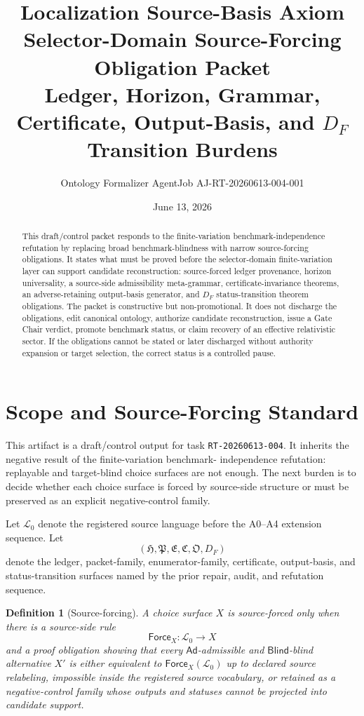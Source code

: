 \documentclass[11pt]{article}
\title{\textbf{Localization Source-Basis Axiom Selector-Domain Source-Forcing Obligation Packet}\\[0.35em]
\large Ledger, Horizon, Grammar, Certificate, Output-Basis, and \(D_F\) Transition Burdens}
\author{Ontology Formalizer AgentJob AJ-RT-20260613-004-001}
\date{June 13, 2026}
\newcommand{\Lang}{\mathcal{L}_{0}}
\newcommand{\PackFam}{\mathfrak{P}}
\newcommand{\EnumFam}{\mathfrak{E}}
\newcommand{\CertFam}{\mathfrak{C}}
\newcommand{\OutFam}{\mathfrak{O}}
\newcommand{\LedgerFam}{\mathfrak{H}}
\newcommand{\Ad}{\mathsf{Ad}}
\newcommand{\Blind}{\mathsf{Blind}}
\newcommand{\Force}{\mathsf{Force}}
\newtheorem{definitionblock}{Definition}
\begin{document}
\maketitle

\begin{abstract}
This draft/control packet responds to the finite-variation
benchmark-independence refutation by replacing broad benchmark-blindness with
narrow source-forcing obligations. It states what must be proved before the
selector-domain finite-variation layer can support candidate reconstruction:
source-forced ledger provenance, horizon universality, a source-side
admissibility meta-grammar, certificate-invariance theorems, an
adverse-retaining output-basis generator, and \(D_F\) status-transition
theorem obligations. The packet is constructive but non-promotional. It does
not discharge the obligations, edit canonical ontology, authorize candidate
reconstruction, issue a Gate Chair verdict, promote benchmark status, or
claim recovery of an effective relativistic sector. If the obligations cannot
be stated or later discharged without authority expansion or target
selection, the correct status is a controlled pause.
\end{abstract}

\section{Scope and Source-Forcing Standard}

This artifact is a draft/control output for task \texttt{RT-20260613-004}.
It inherits the negative result of the finite-variation benchmark-
independence refutation: replayable and target-blind choice surfaces are not
enough. The next burden is to decide whether each choice surface is forced by
source-side structure or must be preserved as an explicit negative-control
family.

Let \(\Lang\) denote the registered source language before the A0--A4
extension sequence. Let
\[
(\LedgerFam,\PackFam,\EnumFam,\CertFam,\OutFam,D_F)
\]
denote the ledger, packet-family, enumerator-family, certificate, output-basis,
and status-transition surfaces named by the prior repair, audit, and
refutation sequence.

\begin{definitionblock}[Source-forcing]
A choice surface \(X\) is source-forced only when there is a source-side rule
\[
\Force_X:\Lang \longrightarrow X
\]
and a proof obligation showing that every \(\Ad\)-admissible and
\(\Blind\)-blind alternative \(X'\) is either equivalent to
\(\Force_X(\Lang)\) up to declared source relabeling, impossible inside the
registered source vocabulary, or retained as a negative-control family whose
outputs and statuses cannot be projected into candidate support.
\end{definitionblock}
\end{document}

